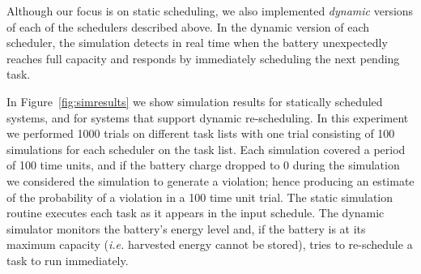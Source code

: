 Although our focus is on static scheduling, we also implemented \emph{dynamic} versions of each of the schedulers described 
above.  In the dynamic version of each scheduler, the simulation detects in real time when the 
battery unexpectedly reaches full capacity and responds by immediately scheduling the next pending task. 








In Figure~\ref{fig:simresults} 
we show simulation results for statically scheduled systems, and for systems that support dynamic re-scheduling.  
In this experiment 
we performed 1000 trials on different task lists
with one trial consisting of 100 simulations for each scheduler on the task list. 
Each simulation covered a period of 100 time units, and if the battery charge dropped to 0 during the simulation we 
considered the simulation to generate a violation; 
hence producing an estimate of the probability of a violation in a 100 time unit trial. 
The static simulation routine executes each task as it appears in the input schedule.  
The dynamic simulator monitors the battery's energy level and, if the battery is at its maximum capacity (\emph{i.e.} harvested energy cannot be stored), tries to re-schedule a task to run immediately.  

